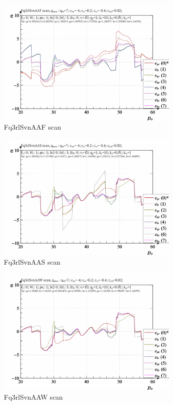 \documentclass[a4paper,10pt]{article}
\begin{document}
\begin{figure}[htb!]
  \centerline{
    \includegraphics[width=0.8\textwidth]{qls-p_p_e_Fq3rlSvnAAF_scan.png}
  }
  \caption{Fq3rlSvnAAF scan}
  \label{atu:f:Fq3rlSvnAAF_scan}
\end{figure}

\begin{figure}[htb!]
  \centerline{
    \includegraphics[width=0.8\textwidth]{qls-p_p_e_Fq3rlSvnAAS_scan.png}
  }
  \caption{Fq3rlSvnAAS scan}
  \label{atu:f:Fq3rlSvnAAS_scan}
\end{figure}

\begin{figure}[htb!]
  \centerline{
    \includegraphics[width=0.8\textwidth]{qls-p_p_e_Fq3rlSvnAAW_scan.png}
  }
  \caption{Fq3rlSvnAAW scan}
  \label{atu:f:Fq3rlSvnAAW_scan}
\end{figure}
\end{document}
